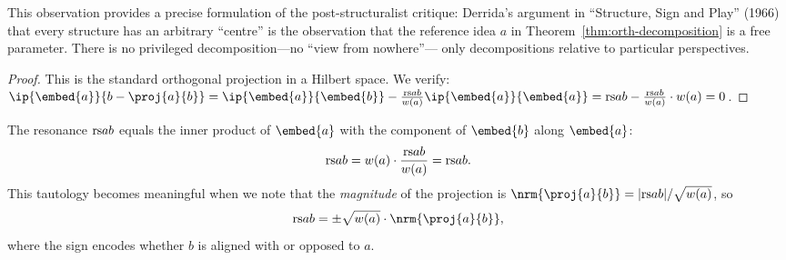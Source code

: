 \begin{interpretation}
This observation provides a precise formulation of the post-structuralist
critique: Derrida's argument in ``Structure, Sign and Play'' (1966) that
every structure has an arbitrary ``centre'' is the observation that the
reference idea $a$ in Theorem~\ref{thm:orth-decomposition} is a free
parameter.  There is no privileged decomposition---no ``view from nowhere''---
only decompositions relative to particular perspectives.
\end{interpretation}



\begin{proof}
This is the standard orthogonal projection in a Hilbert space.  We verify:
$\ip{\embed{a}}{b - \proj{a}{b}}
= \ip{\embed{a}}{\embed{b}} - \frac{\rs{a}{b}}{w(a)} \ip{\embed{a}}{\embed{a}}
= \rs{a}{b} - \frac{\rs{a}{b}}{w(a)} \cdot w(a) = 0$.
\end{proof}

\begin{corollary}
\label{cor:resonance-projection}
The resonance $\mathrm{rs}{a}{b}$ equals the inner product of $\embed{a}$ with the
component of $\embed{b}$ along $\embed{a}$:
\[
  \mathrm{rs}{a}{b} = w(a) \cdot \frac{\mathrm{rs}{a}{b}}{w(a)} = \mathrm{rs}{a}{b}.
\]
This tautology becomes meaningful when we note that the \emph{magnitude} of
the projection is $\nrm{\proj{a}{b}} = |\rs{a}{b}| / \sqrt{w(a)}$, so
\[
  \rs{a}{b} = \pm \sqrt{w(a)} \cdot \nrm{\proj{a}{b}},
\]
where the sign encodes whether $b$ is aligned with or opposed to $a$.
\end{corollary}

